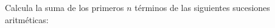 \documentclass[12pt,addpoints]{evalua}
\begin{document}
\begin{questions}
\begin{multicols}{2}
\begin{parts}



            \end{parts}
      \end{multicols}


      \subsection*{\else{}\fi}
      \question[10] Calcula la suma de los primeros $n$ términos de las siguientes sucesiones aritméticas:
      \begin{multicols}{2}
            \begin{parts}

\end{parts}
\end{multicols}
\end{questions}
\end{document}
